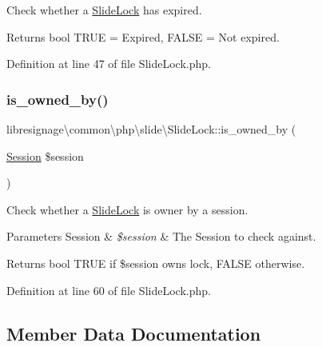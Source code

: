 Check whether a \hyperlink{classlibresignage_1_1common_1_1php_1_1slide_1_1SlideLock}{Slide\+Lock} has expired.

\begin{DoxyReturn}{Returns}
bool T\+R\+UE = Expired, F\+A\+L\+SE = Not expired. 
\end{DoxyReturn}


Definition at line 47 of file Slide\+Lock.\+php.

\mbox{\label{classlibresignage_1_1common_1_1php_1_1slide_1_1SlideLock_a4a5bc1b2cc6ccf15ff0a4e4ab0cfbfb3}} 
\subsubsection{\texorpdfstring{is\+\_\+owned\+\_\+by()}{is\_owned\_by()}}
{\footnotesize\ttfamily libresignage\textbackslash{}common\textbackslash{}php\textbackslash{}slide\textbackslash{}\+Slide\+Lock\+::is\+\_\+owned\+\_\+by (\begin{DoxyParamCaption}\item[{\hyperlink{classlibresignage_1_1common_1_1php_1_1auth_1_1Session}{Session}}]{\$session }\end{DoxyParamCaption})}

Check whether a \hyperlink{classlibresignage_1_1common_1_1php_1_1slide_1_1SlideLock}{Slide\+Lock} is owner by a session.


\begin{DoxyParams}[1]{Parameters}
Session & {\em \$session} & The Session to check against.\\
\hline
\end{DoxyParams}
\begin{DoxyReturn}{Returns}
bool T\+R\+UE if \$session owns lock, F\+A\+L\+SE otherwise. 
\end{DoxyReturn}


Definition at line 60 of file Slide\+Lock.\+php.



\subsection{Member Data Documentation}
\mbox{\label{classlibresignage_1_1common_1_1php_1_1slide_1_1SlideLock_a2a98a3a7cea4f53e7117ae50ced307c4}} 
